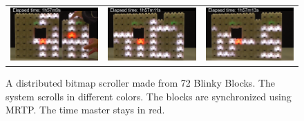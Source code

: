{\begin{figure}[h!]
\begin{tabular}{c c c}
			
			\includegraphics[width=\subFigureWidth]{images/time-synchronization/scroller/sync_1h57m9s} &
			\includegraphics[width=\subFigureWidth]{images/time-synchronization/scroller/sync_1h57m11s}  &
			\includegraphics[width=\subFigureWidth]{images/time-synchronization/scroller/sync_1h57m13s}
			
		\end{tabular}	
		\caption{A distributed bitmap scroller made from 72 Blinky Blocks. The system scrolls  in different colors. The blocks are synchronized using MRTP. The time master stays in red.\label{fig:time-sync:bitmap-scroller}}
	\end{figure}
}

